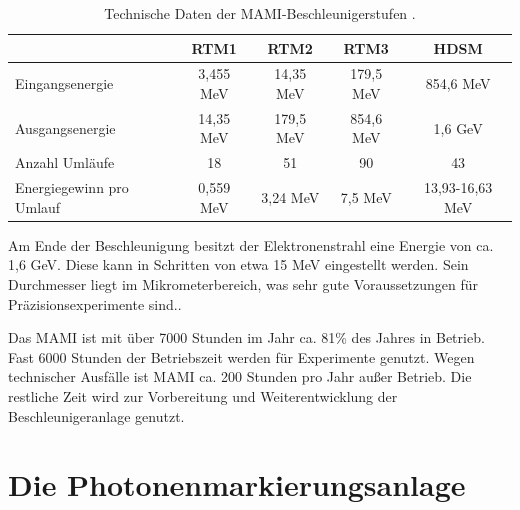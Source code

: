 \documentclass[a4paper,11pt,oneside,final,german,openbib,pdftex]{scrbook}
\begin{document}
{\begin{table}[h!]
		\begin{tabular}{p{3cm}cccc}
			\hline
			& RTM1 & RTM2 & RTM3 & HDSM \\

			\hline
			Eingangsenergie &3,455 MeV  &  14,35 MeV& 179,5 MeV  &854,6 MeV \\
			Ausgangsenergie &14,35 MeV  &  179,5 MeV &854,6 MeV  & 1,6 GeV \\ 
			Anzahl Uml\"aufe&18  &51  &90  &43 \\ 
			Energiegewinn  
			pro Umlauf &0,559 MeV  & 3,24 MeV & 7,5 MeV  & 13,93-16,63 MeV \\ 
			
	
		\end{tabular}

		\caption[Technische Daten der Mamibeschleunigerstufen]{Technische Daten der MAMI-Beschleunigerstufen \cite{Un08}.}
		\label{tab.MAMIstufen}

\end{table}

 Am Ende der Beschleunigung besitzt der Elektronenstrahl eine Energie von ca. 1,6 GeV. Diese kann in Schritten von etwa 15 MeV eingestellt werden. Sein Durchmesser liegt im Mikrometerbereich, was sehr gute Voraussetzungen f\"ur Pr\"azisionsexperimente sind.\cite{KPh07}. 
 
 Das MAMI ist mit \"uber 7000 Stunden im Jahr ca. 81\% des Jahres in Betrieb. Fast 6000 Stunden der Betriebszeit werden f\"ur Experimente genutzt. Wegen technischer Ausf\"alle ist MAMI ca. 200 Stunden pro Jahr au{\ss}er Betrieb. Die restliche Zeit wird zur Vorbereitung und Weiterentwicklung der Beschleunigeranlage genutzt.\cite{KPh11B}
 
 
 \section{Die Photonenmarkierungsanlage}
 
}
\end{document}
